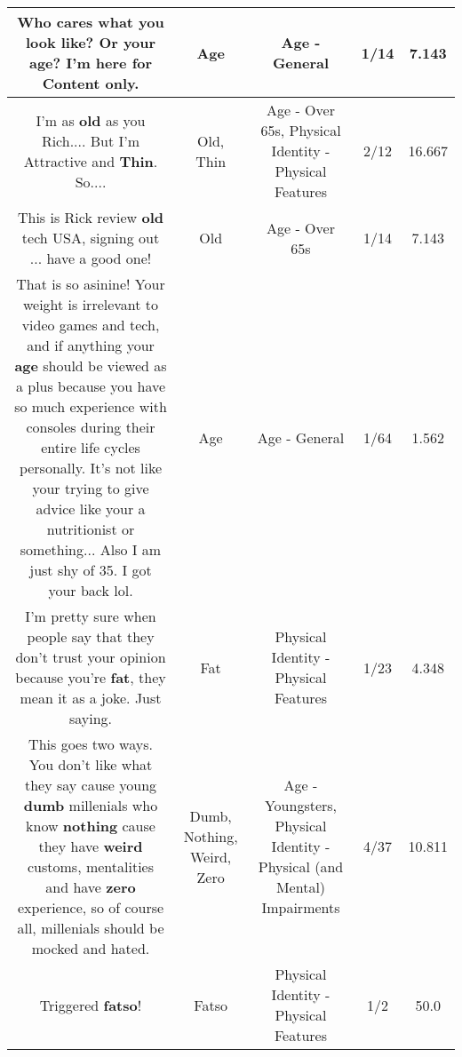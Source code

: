 \documentclass[11pt]{article}
\newlength\mylength
\begin{document}
\begin{center}
\begin{longtable}{|C{.65\mylength}|C{.30\mylength}|C{.12\mylength}|C{.12\mylength}|C{.12\mylength}|}
  \small Who cares what you look like? Or your \textbf{age}? I'm here for Content only.\normalsize   & Age & Age - General & 1/14 & 7.143 \\  \hline
  \small I'm as \textbf{old} as you Rich.... But I'm Attractive and \textbf{Thin}. So....\normalsize   & Old, Thin & Age - Over 65s, Physical Identity - Physical Features & 2/12 & 16.667 \\  \hline
  \small This is Rick review \textbf{old} tech USA, signing out ... have a good one!\normalsize   & Old & Age - Over 65s & 1/14 & 7.143 \\  \hline
  \small That is so asinine!  Your weight is irrelevant to video games and tech, and if anything your \textbf{age} should be viewed as a plus because you have so much experience with consoles during their entire life cycles personally.  It's not like your trying to give advice like your a nutritionist or something...  Also I am just shy of 35.  I got your back lol.\normalsize   & Age & Age - General & 1/64 & 1.562 \\  \hline
  \small I'm pretty sure when people say that they don't trust your opinion because you're \textbf{fat}, they mean it as a joke. Just saying.\normalsize   & Fat & Physical Identity - Physical Features & 1/23 & 4.348 \\  \hline
  \small This goes two ways. You don't like what they say cause young \textbf{dumb} millenials who know \textbf{nothing} cause they have \textbf{weird} customs, mentalities and have \textbf{zero} experience, so of course all, millenials should be mocked and hated.\normalsize   & Dumb, Nothing, Weird, Zero & Age - Youngsters, Physical Identity - Physical (and Mental) Impairments & 4/37 & 10.811 \\  \hline
  \small Triggered \textbf{fatso}!\normalsize   & Fatso & Physical Identity - Physical Features & 1/2 & 50.0 \\  \hline

\end{longtable}
\end{center}
\end{document}
